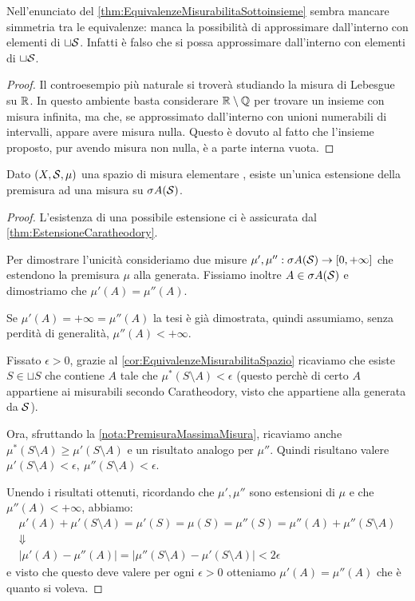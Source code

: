 \begin{remark}
	Nell'enunciato del \cref{thm:EquivalenzeMisurabilitaSottoinsieme} sembra mancare simmetria tra le equivalenze: manca la possibilità di approssimare dall'interno con elementi di $\sqcup\S$. Infatti è falso che si possa approssimare dall'interno con elementi di $\sqcup\S$.
\end{remark}
\begin{proof}
	Il controesempio più naturale si troverà studiando la misura di Lebesgue su $\R$. In questo ambiente basta considerare $\R\setminus\mathbb Q$ per trovare un insieme con misura infinita, ma che, se approssimato dall'interno con unioni numerabili di intervalli, appare avere misura nulla. Questo è dovuto al fatto che l'insieme proposto, pur avendo misura non nulla, è a parte interna vuota.
\end{proof}




\begin{proposition}\label{prop:UnicitaCaratheodory}
	Dato $(X,\S,\mu)$ una spazio di misura elementare \sigfin[o], esiste un'unica estensione della premisura ad una misura su $\sigma A(\S)$.
\end{proposition}
\begin{proof}
	L'esistenza di una possibile estensione ci è assicurata dal \cref{thm:EstensioneCaratheodory}.
	
	Per dimostrare l'unicità consideriamo due misure $\mu',\mu'':\sigma A(\S)\to\Rpiu$ che estendono la premisura $\mu$ alla \sigalg{} generata. Fissiamo inoltre $A\in\sigma A(\S)$ e dimostriamo che $\mu'(A)=\mu''(A)$.
	
	Se $\mu'(A)=+\infty=\mu''(A)$ la tesi è già dimostrata,  quindi assumiamo, senza perdità di generalità, $\mu''(A)<+\infty$.
	
	Fissato $\epsilon>0$, grazie al \cref{cor:EquivalenzeMisurabilitaSpazio} ricaviamo che esiste $S\in\sqcup S$ che contiene $A$ tale che $\mu^*(S\setminus A)< \epsilon$ (questo perchè di certo $A$ appartiene ai misurabili secondo Caratheodory, visto che appartiene alla \sigalg{} generata da $\S$).
	
	Ora, sfruttando la \cref{nota:PremisuraMassimaMisura}, ricaviamo anche $\mu^*(S\setminus A)\ge\mu'(S\setminus A)$ e un risultato analogo per $\mu''$. Quindi risultano valere $\mu'(S\setminus A)<\epsilon,\ \mu''(S\setminus A)<\epsilon$.
	
	Unendo i risultati ottenuti, ricordando che $\mu',\mu''$ sono estensioni di $\mu$ e che $\mu''(A)<+\infty$,  abbiamo:
	\begin{gather*}
		\mu'(A)+\mu'(S\setminus A)=\mu'(S)=\mu(S)=\mu''(S)=\mu''(A)+\mu''(S\setminus A) \\
		\Downarrow \\
		\lvert\mu'(A)-\mu''(A)\rvert=\lvert\mu''(S\setminus A)-\mu'(S\setminus A)\rvert<2\epsilon
	\end{gather*}
	e visto che questo deve valere per ogni $\epsilon>0$ otteniamo $\mu'(A)=\mu''(A)$ che è quanto si voleva.
\end{proof}

